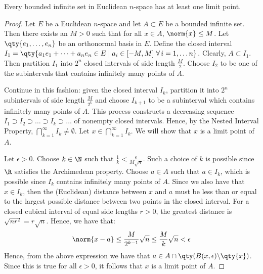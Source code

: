 \begin{proposition}
  \label{thm:boundedlim}
  Every bounded infinite set in Euclidean \( n \)-space has at least one limit point.
\end{proposition}
\begin{proof}
  Let \( E \) be a Euclidean \( n \)-space and let \( A\subset E \) be a bounded infinite set. Then there exists an \( M>0 \) such that for all \( x\in A \), \( \norm{x}\leq M \). Let \( \qty{e_1,\dots,e_n} \) be an orthonormal basis in \( E \). Define the closed interval \( I_1=\qty{a_1e_1+\dots+a_ne_n\in E\mid a_i\in[-M,M]\; \forall\, i=1,\dots n} \). Clearly, \( A\subset I_1 \). Then partition \( I_1 \) into \( 2^n \) closed intervals of side length \( \frac{M}{2} \). Choose \( I_2 \) to be one of the subintervals that contains infinitely many points of \( A \).

  \vspace{3mm}

  Continue in this fashion: given the closed interval \( I_k \), partition it into \( 2^n \) subintervals of side length \( \frac{M}{2^{k}} \) and choose \( I_{k+1} \) to be a subinterval which contains infinitely many points of \( A \). This process constructs a decreasing sequence \( I_1\supset I_2\supset\dots\supset I_k\supset\dots \) of nonempty closed intervals. Hence, by the Nested Interval Property, \( \bigcap_{k=1}^\infty I_k\neq\emptyset \). Let \( x\in\bigcap_{k=1}^\infty I_k \). We will show that \( x \) is a limit point of \( A \).

  \vspace{3mm}

  Let \( \epsilon>0 \). Choose \( k\in\N \) such that \( \frac{1}{k}<\frac{\epsilon}{M\sqrt{n}} \). Such a choice of \( k \) is possible since \( \R \) satisfies the Archimedean property. Choose \( a\in A \) such that \( a\in I_k \), which is possible since \( I_k \) contains infinitely many points of \( A \). Since we also have that \( x\in I_k \), then the (Euclidean) distance between \( x \) and \( a \) must be less than or equal to the largest possible distance between two points in the closed interval. For a closed cubical interval of equal side lengths \( r>0 \), the greatest distance is \( \sqrt{nr^2}=r\sqrt{n} \). Hence, we have that:
  \[ \norm{x-a}\leq\frac{M}{2^{k-1}}\sqrt{n}\leq\frac{M}{k}\sqrt{n}<\epsilon \]
  Hence, from the above expression we have that \( a\in A\cap\qty(B(x,\epsilon)\backslash\qty{x}) \). Since this is true for all \( \epsilon>0 \), it follows that \( x \) is a limit point of \( A \).
\end{proof}

